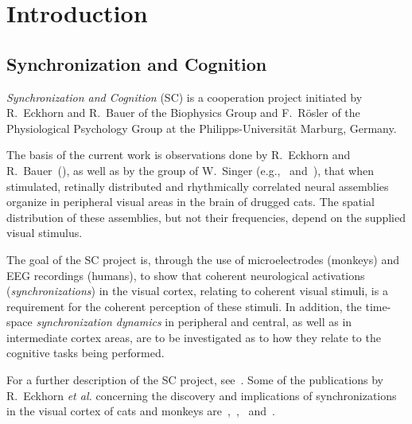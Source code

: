 
\chapter{Introduction}
\label{intro}

\section{Synchronization and Cognition}
\label{intro:synch}

{\em Synchronization and Cognition\/} (SC) is a cooperation project
initiated by R.\ Eckhorn and R.\ Bauer of the Biophysics Group and F.\ 
R\"{o}sler of the Physiological Psychology Group at the
Philipps-Universit\"{a}t Marburg, Germany.

The basis of the current work is observations done by R.\ Eckhorn and
R.\ Bauer~(\cite{cat}), as well as by the group of W.\ Singer
(e.g.,~\cite{singer2} and~\cite{singer1}), that when stimulated,
retinally distributed and rhythmically correlated neural assemblies
organize in peripheral visual areas in the brain of drugged cats.  The
spatial distribution of these assemblies, but not their frequencies,
depend on the supplied visual stimulus.

The goal of the SC project is, through the use of microelectrodes
(monkeys) and EEG recordings (humans), to show that coherent
neurological activations ({\em synchronizations\/}) in the visual
cortex, relating to coherent visual stimuli, is a requirement for the
coherent perception of these stimuli.  In addition, the time-space
{\em synchronization dynamics\/} in peripheral and central, as well as
in intermediate cortex areas, are to be investigated as to how they
relate to the cognitive tasks being performed.

For a further description of the SC project, see~\cite{antrag}.  Some
of the publications by R.\ Eckhorn {\em et al.\/} concerning the
discovery and implications of synchronizations in the visual cortex of
cats and monkeys are~\cite{eckhorn1},~\cite{eckhorn2},~\cite{cat}
and~\cite{eckhorn3}.

